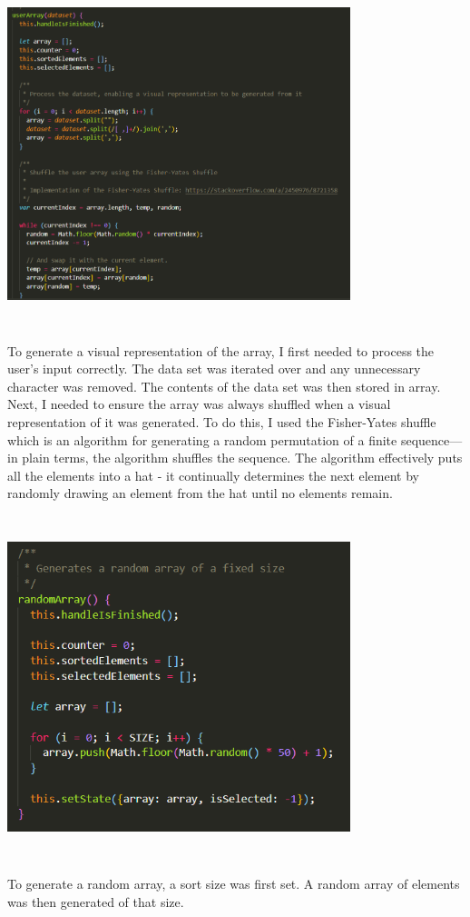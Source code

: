 \begin{center}
    \includegraphics[width=10cm,height=10cm,keepaspectratio]{images/userarray}
\end{center}
To generate a visual representation of the array, I first needed to process the user's input correctly. The data set was iterated over and any unnecessary character was removed. The contents of the data set was then stored in array. Next, I needed to ensure the array was always shuffled when a visual representation of it was generated. To do this, I used the Fisher-Yates shuffle which is an algorithm for generating a random permutation of a finite sequence—in plain terms, the algorithm shuffles the sequence. The algorithm effectively puts all the elements into a hat - it continually determines the next element by randomly drawing an element from the hat until no elements remain.
\par
\bigskip
\begin{center}
    \includegraphics[width=10cm,height=10cm,keepaspectratio]{images/randomArray}
\end{center}
To generate a random array, a sort size was first set. A random array of elements was then generated of that size.

